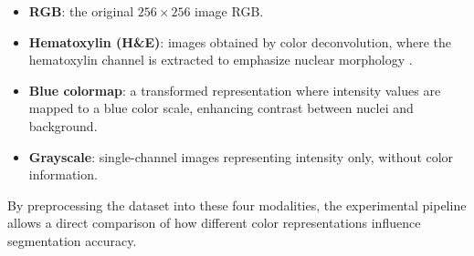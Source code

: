 \documentclass[target=bach,aauheader=,style=]{thud}
\begin{document}
\begin{itemize}
    \item \textbf{RGB}: the original $256 \times 256$ image RGB.
    \item \textbf{Hematoxylin (H\&E)}: images obtained by color deconvolution, where the hematoxylin channel is extracted to emphasize nuclear morphology \cite{ruifrok2001quantification}.
    \item \textbf{Blue colormap}: a transformed representation where intensity values are mapped to a blue color scale, enhancing contrast between nuclei and background.
    \item \textbf{Grayscale}: single-channel images representing intensity only, without color information.
\end{itemize}
By preprocessing the dataset into these four modalities, the experimental pipeline allows a direct comparison of how different color representations influence segmentation accuracy. 
\end{document}
